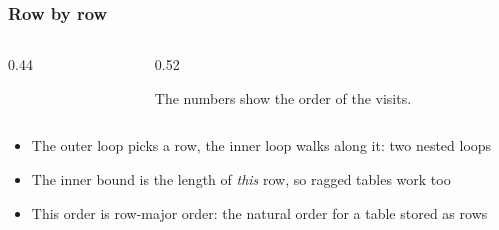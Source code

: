 \documentclass[aspectratio=169,10pt,compress]{beamer}
\begin{document}
\begin{frame}[t,fragile] \frametitle{Row by row}
	\begin{columns}[T]
		\begin{column}{0.44\textwidth}


\begin{algorithm}[H]
				\caption{RowByRow($t$)}
\end{algorithm}

		\end{column}
		\begin{column}{0.52\textwidth}
			\begin{center}
			\end{center}
			\small The numbers show the order of the visits.
		\end{column}
	\end{columns}

	\vspace{0.5em}
	\begin{itemize}\small
		\item The outer loop picks a row, the inner loop walks along it: two nested loops
		\item The inner bound is the length of \emph{this} row, so ragged tables work too
		\item This order is row-major order: the natural order for a table stored as rows
	\end{itemize}
\end{frame}
\end{document}
